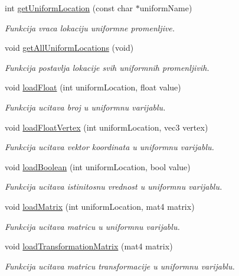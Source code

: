 \begin{DoxyCompactItemize}
int \hyperlink{classshader_1_1Shader_a91ddc84588431a520654096a74ca3671}{get\+Uniform\+Location} (const char $\ast$uniform\+Name)
\begin{DoxyCompactList}\small\item\em Funkcija vraca lokaciju uniformne promenljive. \end{DoxyCompactList}\item 
void \hyperlink{classshader_1_1Shader_a31d479c8502f9172c8b9393be362f391}{get\+All\+Uniform\+Locations} (void)
\begin{DoxyCompactList}\small\item\em Funkcija postavlja lokacije svih uniformnih promenljivih. \end{DoxyCompactList}\item 
void \hyperlink{classshader_1_1Shader_ae9dde8789a747d037f136c91a8cc03b6}{load\+Float} (int uniform\+Location, float value)
\begin{DoxyCompactList}\small\item\em Funkcija ucitava broj u uniformnu varijablu. \end{DoxyCompactList}\item 
void \hyperlink{classshader_1_1Shader_a06b6080ebb6c1735747771678dbec4b6}{load\+Float\+Vertex} (int uniform\+Location, vec3 vertex)
\begin{DoxyCompactList}\small\item\em Funkcija ucitava vektor koordinata u uniformnu varijablu. \end{DoxyCompactList}\item 
void \hyperlink{classshader_1_1Shader_acb1ec74c8d2ad5218669ece88a6dd491}{load\+Boolean} (int uniform\+Location, bool value)
\begin{DoxyCompactList}\small\item\em Funkcija ucitava istinitosnu vrednost u uniformnu varijablu. \end{DoxyCompactList}\item 
void \hyperlink{classshader_1_1Shader_ac2d90fdd4dfb7077046ec35b050660ee}{load\+Matrix} (int uniform\+Location, mat4 matrix)
\begin{DoxyCompactList}\small\item\em Funkcija ucitava matricu u uniformnu varijablu. \end{DoxyCompactList}\item 
void \hyperlink{classshader_1_1Shader_a5f73b4e8e0e9a72ea40072207394952d}{load\+Transformation\+Matrix} (mat4 matrix)
\begin{DoxyCompactList}\small\item\em Funkcija ucitava matricu transformacije u uniformnu varijablu. \end{DoxyCompactList}\item 

\end{DoxyCompactItemize}
